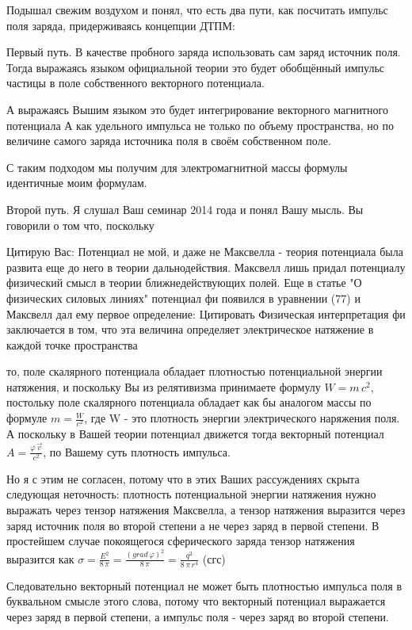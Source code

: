 \documentclass{article}
\begin{document}
Подышал свежим воздухом и понял, что есть два пути, как посчитать импульс поля заряда, придерживаясь концепции ДТПМ:

Первый путь. В качестве пробного заряда использовать сам заряд источник поля. Тогда выражаясь языком официальной теории это будет обобщённый импульс частицы в поле собственного векторного потенциала.

А выражаясь Вышим языком это будет интегрирование  векторного магнитного потенциала А как удельного импульса  не только  по объему пространства, но по величине самого заряда источника поля в своём собственном поле.

С таким подходом мы получим для электромагнитной массы формулы идентичные моим формулам.

Второй путь. Я слушал Ваш семинар 2014 года и понял Вашу мысль. Вы говорили о том что, поскольку

Цитирую Вас: Потенциал не мой, и даже не Максвелла - теория потенциала была развита еще до него в теории дальнодействия. Максвелл лишь придал потенциалу физический смысл в теории ближнедействующих полей. Еще в статье "О физических силовых линиях" потенциал фи появился в уравнении (77) и Максвелл дал ему первое определение:
Цитировать
Физическая интерпретация фи заключается в том, что эта величина определяет электрическое натяжение в каждой точке пространства


то, поле скалярного потенциала обладает плотностью потенциальной энергии натяжения, и поскольку Вы из релятивизма принимаете формулу $W = m\,c^2$, постольку поле скалярного потенциала обладает как бы аналогом массы по формуле $m = \frac{W}{c^2}$, где W - это плотность энергии электрического наряжения поля.
А поскольку в Вашей теории потенциал движется тогда векторный потенциал $A = \frac{\varphi\,\vec{v}}{c^2}$, по Вашему суть плотность импульса.

Но я с этим не согласен, потому что в этих Ваших рассуждениях скрыта следующая неточность:
плотность потенциальной энергии натяжения нужно выражать через тензор натяжения Максвелла, а тензор натяжения выразится через заряд источник поля во второй степени а не через заряд в первой степени.
В простейшем случае покоящегося сферического заряда тензор натяжения выразится как $\sigma = \frac{E^2}{8\,\pi} =\frac{\left(grad\,\varphi\right)^2}{8\,\pi}=\frac{q^2}{8\,\pi\,r^4}$ (сгс)

Следовательно векторный потенциал не может быть плотностью импульса поля в буквальном смысле этого слова, потому что векторный потенциал выражается через заряд в первой степени, а импульс поля - через заряд во второй степени.
\end{document}
